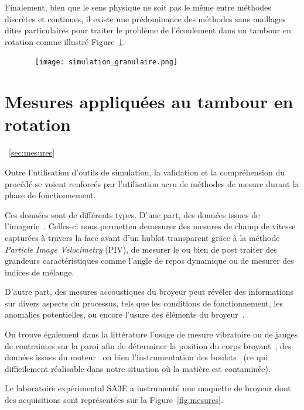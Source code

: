 Finalement, bien que le sens physique ne soit pas le même entre méthodes discrètes et continues, il existe une prédominance des méthodes sans maillages dites particulaires pour traiter le problème de l'écoulement dans un tambour en rotation comme illustré Figure~\ref{fig:simu_granulaire}.

\begin{figure}~\label{fig:simu_granulaire}
    \centering
    \texttt{[image: simulation\_granulaire.png]}
\end{figure}

\section{Mesures appliquées au tambour en rotation}~\ref{sec:mesures}

Outre l'utilisation d'outils de simulation, la validation et la compréhension du procédé se voient renforcés par l'utilisation acru de méthodes de mesure durant la phase de fonctionnement.

Ces données sont de différents types. D'une part, des données issues de l'imagerie~\cite{jarray_wet_2019,Adepu}. Celles-ci nous permetten demesurer des mesures de champ de vitesse capturées à travers la face avant d'un hublot transparent grâce à la méthode \textit{Particle Image Velocimetry} (PIV), de mesurer le ou bien de post traiter des grandeurs caractéristiques comme l'angle de repos dynamique ou de mesurer des indices de mélange.

D'autre part, des mesures accoustiques du broyeur peut révéler des informations sur divers aspects du processus, tels que les conditions de fonctionnement, les anomalies potentielles, ou encore l'usure des éléments du broyeur~\cite{Owusu, almond}.

On trouve également dans la littérature l'usage de mesure vibratoire ou de jauges de contraintes sur la paroi afin de déterminer la position du corps broyant~\cite{Davey, tano_2005}, des données issues du moteur~\cite{pedrayes_frequency_2017} ou bien l'instrumentation des boulets~\cite{Wang} (ce qui difficilement réalisable dans notre situation où la matière est contaminée).

Le laboratoire expérimental SA3E a instrumenté une maquette de broyeur dont des acquisitions sont représentées sur la Figure~\ref{fig:mesures}.

